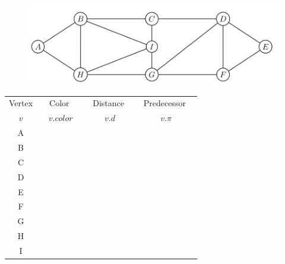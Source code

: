 \documentclass[12pt]{article}
\newcommand{\vs}{\vspace{2mm}}
\newcommand{\ls}{\vspace{5mm}}
\newcommand{\hs}{\hspace{10mm}}
\newcommand{\ha}{\hspace{1mm}}
\begin{document}
\begin{figure}[!h]
\centering
\includegraphics[scale=.74]{graph-image-v1.jpg}
\end{figure}


\begin{tabular}{|c|c|c|c|} \hline
  Vertex  & \hs\ \ha\  Color \hs\ \ha\ & \hs\  Distance \hs\ & \ha\ Predecessor \ha\  \\
  $v$ & $v.color$ & $v.d$ & $v.\pi$ \\ \hline
  A & & & \\ \hline
  B & & & \\ \hline
  C & & & \\ \hline
  D & & & \\ \hline
  E & & & \\ \hline
  F & & & \\ \hline
  G & & & \\ \hline
  H & & & \\ \hline
  I & & & \\ \hline
\end{tabular}
\vs\
\ls\
\end{document}
